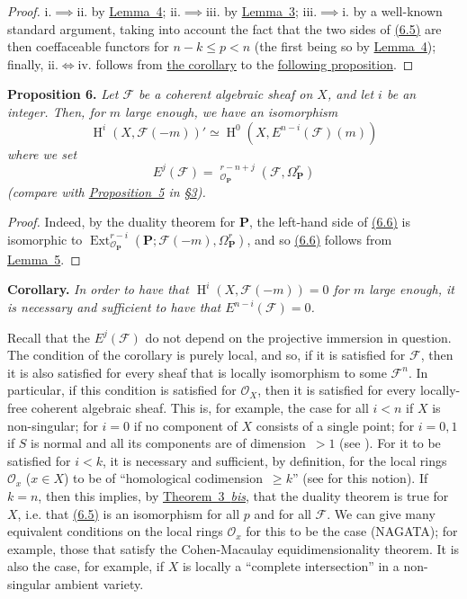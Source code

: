 \documentclass{article}
\newenvironment{itenv}[1]
  {\phantomsection\par\medskip\noindent\textbf{#1.}\itshape}
  {\medskip}
\newcommand{\scr}[1]{{\mathscr{#1}}}
\newcommand{\bb}{\mathbf}
\renewcommand{\geq}{\geqslant}
\renewcommand{\leq}{\leqslant}
\DeclareMathOperator{\Ext}{Ext}
\DeclareMathOperator{\shExt}{\underline{Ext}}
\DeclareMathOperator{\HH}{H}
\newcommand{\oldpage}[1]{\marginpar{\footnotesize$\Big\vert$ \textit{p.~#1}}}
\begin{document}
\begin{proof}
  i.$\implies$ii. by \hyperref[lemma4]{Lemma~4};
  ii.$\implies$iii. by \hyperref[lemma3]{Lemma~3};
  iii.$\implies$i. by a well-known standard argument, taking into account the fact that the two sides of \hyperref[6.5]{(6.5)} are then coeffaceable functors for $n-k\leq p< n$ (the first being so by \hyperref[lemma4]{Lemma~4});
  finally, ii.$\iff$iv. follows from \hyperref[proposition6corollary]{the corollary} to the \hyperref[proposition6]{following proposition}.
\end{proof}

\begin{itenv}{Proposition 6}
\label{proposition6}
  Let $\scr{F}$ be a coherent algebraic sheaf on $X$, and let $i$ be an integer.
  Then, for $m$ large enough, we have an isomorphism
  \[
  \label{6.6}
    \HH^i(X,\scr{F}(-m))' \simeq \HH^0(X,E^{n-i}(\scr{F})(m))
  \tag{6.6}
  \]
  where we set
  \[
  \label{6.7}
    E^j(\scr{F}) = \shExt_{\scr{O}_\bb{P}}^{r-n+j}(\scr{F},\Omega_\bb{P}^r)
  \tag{6.7}
  \]
  (compare with \hyperref[proposition5]{Proposition~5} in \hyperref[section3]{\S3}).
\end{itenv}

\begin{proof}
  Indeed, by the duality theorem for $\bb{P}$, the left-hand side of \hyperref[6.6]{(6.6)} is isomorphic to $\Ext_{\scr{O}_\bb{P}}^{r-i}(\bb{P};\scr{F}(-m),\Omega_\bb{P}^r)$, and so \hyperref[6.6]{(6.6)} follows from \hyperref[lemma5]{Lemma~5}.
\end{proof}

\oldpage{149-19}
\begin{itenv}{Corollary}
\label{proposition6corollary}
  In order to have that $\HH^i(X,\scr{F}(-m))=0$ for $m$ large enough, it is necessary and sufficient to have that $E^{n-i}(\scr{F})=0$.
\end{itenv}

Recall that the $E^j(\scr{F})$ do not depend on the projective immersion in question.
The condition of the corollary is purely local, and so, if it is satisfied for $\scr{F}$, then it is also satisfied for every sheaf that is locally isomorphism to some $\scr{F}^n$.
In particular, if this condition is satisfied for $\scr{O}_X$, then it is satisfied for every locally-free coherent algebraic sheaf.
This is, for example, the case for all $i<n$ if $X$ is non-singular; for $i=0$ if no component of $X$ consists of a single point; for $i=0,1$ if $S$ is normal and all its components are of dimension~$>1$ (see \cite{3}).
For it to be satisfied for $i<k$, it is necessary and sufficient, by definition, for the local rings $\scr{O}_x$ ($x\in X$) to be of ``homological codimension~$\geq k$'' (see \cite{4} for this notion).
If $k=n$, then this implies, by \hyperref[theorem3bis]{Theorem~3~\emph{bis}}, that the duality theorem is true for $X$, i.e. that \hyperref[6.5]{(6.5)} is an isomorphism for all $p$ and for all $\scr{F}$.
We can give many equivalent conditions on the local rings $\scr{O}_x$ for this to be the case (NAGATA);
for example, those that satisfy the Cohen-Macaulay equidimensionality theorem.
It is also the case, for example, if $X$ is locally a ``complete intersection'' in a non-singular ambient variety.
\end{document}
